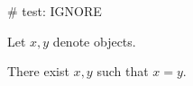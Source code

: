 # test: IGNORE

\begin{forthel}
    Let $x, y$ denote objects.

    \begin{lemma}
        There exist $x, y$ such that $x = y$.
    \end{lemma}
\end{forthel}
